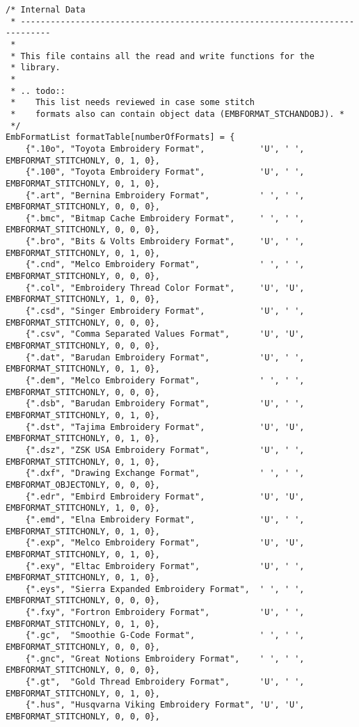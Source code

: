 \begin{lstlisting}
/* Internal Data
 * ----------------------------------------------------------------------------
 *
 * This file contains all the read and write functions for the
 * library.
 *
 * .. todo::
 *    This list needs reviewed in case some stitch
 *    formats also can contain object data (EMBFORMAT_STCHANDOBJ). *
 */
EmbFormatList formatTable[numberOfFormats] = {
    {".10o", "Toyota Embroidery Format",           'U', ' ', EMBFORMAT_STITCHONLY, 0, 1, 0},
    {".100", "Toyota Embroidery Format",           'U', ' ', EMBFORMAT_STITCHONLY, 0, 1, 0},
    {".art", "Bernina Embroidery Format",          ' ', ' ', EMBFORMAT_STITCHONLY, 0, 0, 0},
    {".bmc", "Bitmap Cache Embroidery Format",     ' ', ' ', EMBFORMAT_STITCHONLY, 0, 0, 0},
    {".bro", "Bits & Volts Embroidery Format",     'U', ' ', EMBFORMAT_STITCHONLY, 0, 1, 0},
    {".cnd", "Melco Embroidery Format",            ' ', ' ', EMBFORMAT_STITCHONLY, 0, 0, 0},
    {".col", "Embroidery Thread Color Format",     'U', 'U', EMBFORMAT_STITCHONLY, 1, 0, 0},
    {".csd", "Singer Embroidery Format",           'U', ' ', EMBFORMAT_STITCHONLY, 0, 0, 0},
    {".csv", "Comma Separated Values Format",      'U', 'U', EMBFORMAT_STITCHONLY, 0, 0, 0},
    {".dat", "Barudan Embroidery Format",          'U', ' ', EMBFORMAT_STITCHONLY, 0, 1, 0},
    {".dem", "Melco Embroidery Format",            ' ', ' ', EMBFORMAT_STITCHONLY, 0, 0, 0},
    {".dsb", "Barudan Embroidery Format",          'U', ' ', EMBFORMAT_STITCHONLY, 0, 1, 0},
    {".dst", "Tajima Embroidery Format",           'U', 'U', EMBFORMAT_STITCHONLY, 0, 1, 0},
    {".dsz", "ZSK USA Embroidery Format",          'U', ' ', EMBFORMAT_STITCHONLY, 0, 1, 0},
    {".dxf", "Drawing Exchange Format",            ' ', ' ', EMBFORMAT_OBJECTONLY, 0, 0, 0},
    {".edr", "Embird Embroidery Format",           'U', 'U', EMBFORMAT_STITCHONLY, 1, 0, 0},
    {".emd", "Elna Embroidery Format",             'U', ' ', EMBFORMAT_STITCHONLY, 0, 1, 0},
    {".exp", "Melco Embroidery Format",            'U', 'U', EMBFORMAT_STITCHONLY, 0, 1, 0},
    {".exy", "Eltac Embroidery Format",            'U', ' ', EMBFORMAT_STITCHONLY, 0, 1, 0},
    {".eys", "Sierra Expanded Embroidery Format",  ' ', ' ', EMBFORMAT_STITCHONLY, 0, 0, 0},
    {".fxy", "Fortron Embroidery Format",          'U', ' ', EMBFORMAT_STITCHONLY, 0, 1, 0},
    {".gc",  "Smoothie G-Code Format",             ' ', ' ', EMBFORMAT_STITCHONLY, 0, 0, 0},
    {".gnc", "Great Notions Embroidery Format",    ' ', ' ', EMBFORMAT_STITCHONLY, 0, 0, 0},
    {".gt",  "Gold Thread Embroidery Format",      'U', ' ', EMBFORMAT_STITCHONLY, 0, 1, 0},
    {".hus", "Husqvarna Viking Embroidery Format", 'U', 'U', EMBFORMAT_STITCHONLY, 0, 0, 0},

\end{lstlisting}
